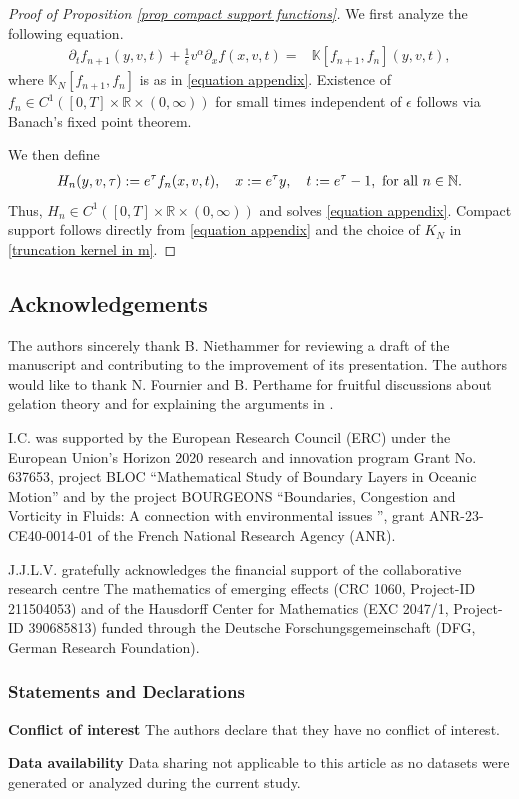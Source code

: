 \documentclass[11pt]{article}
\numberwithin{equation}{section}
\begin{document}
\begin{proof}[Proof of Proposition \ref{prop compact support functions}]
We first analyze the following equation.
\begin{align}
    \partial_{t}f_{n+1}(y,v,t)+\frac{1}{\epsilon}v^{\alpha}\partial_{x}f(x,v,t)=&\mathbb{K}[f_{n+1},f_{n}](y,v,t),
\end{align}
where $\mathbb{K}_{N}[f_{n+1},f_{n}]$ is as in \eqref{equation appendix}. Existence of $f_{n}\in C^{1}([0,T]\times\mathbb{R}\times (0,\infty))$ for small times independent of $\epsilon$ follows via Banach's fixed point theorem.

We then define
\begin{align*}
H_{n}(y,v,\tau):=e^{\tau}f_{n}(x,v,t), \quad x:=e^{\tau}y, \quad t:=e^{\tau}-1, \textup{ for all } n\in\mathbb{N}.
\end{align*}
Thus, $H_{n}\in C^{1}([0,T]\times\mathbb{R}\times (0,\infty))$ and solves \eqref{equation appendix}. Compact support follows directly from \eqref{equation appendix} and the choice of $K_{N}$ in \eqref{truncation kernel in m}.


\end{proof}

\subsection*{Acknowledgements}
 The authors sincerely thank B. Niethammer  for reviewing a draft of the manuscript and contributing to the improvement of its presentation. The authors would like to thank  N. Fournier and  B. Perthame for fruitful discussions about gelation theory and for explaining the arguments in \cite{gelfournier2025}.

I.C. was supported by the European Research Council (ERC) under the European Union's Horizon 2020 research and innovation program Grant No. 637653, project BLOC ``Mathematical Study of Boundary Layers in Oceanic Motion'' and by the project BOURGEONS ``Boundaries, Congestion and Vorticity in Fluids: A connection with environmental issues '', grant ANR-23-CE40-0014-01 of the French National Research Agency (ANR).

J.J.L.V. gratefully acknowledges the financial support of the collaborative
research centre The mathematics of emerging effects (CRC 1060, Project-ID 211504053) and of the Hausdorff Center for Mathematics (EXC 2047/1, Project-ID 390685813) funded through the Deutsche Forschungsgemeinschaft (DFG, German Research Foundation).



\subsubsection*{Statements and Declarations}

\textbf{Conflict of interest} The authors declare that they have no conflict of interest.

\textbf{Data availability} Data sharing not applicable to this article as no datasets were generated or analyzed during the current study.

\printbibliography
\end{document}
